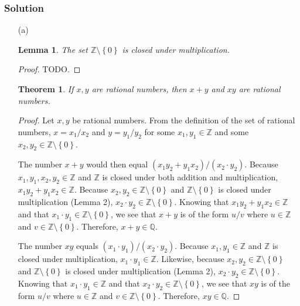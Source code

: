 \documentclass[12pt]{article}
\newtheorem*{thm}{Theorem}
\newtheorem{lem}{Lemma}
\begin{document}
\subsubsection*{Solution}
\begin{itemize}
\item[(a)]
\begin{lem}
The set $\mathbb{Z} \setminus \left\{0\right\}$ is closed under multiplication.
\end{lem}

\begin{proof}
TODO.
\end{proof}

\begin{thm}
If $x, y$ are rational numbers, then $x + y$ and $xy$ are rational numbers.
\end{thm}

\begin{proof}
Let $x, y$ be rational numbers. From the definition of the set of rational numbers, $x = x_1/x_2$ and $y = y_1/y_2$ for some $x_1, y_1 \in \mathbb{Z}$ and some $x_2, y_2 \in \mathbb{Z} \setminus \left\{0\right\}$.

The number $x + y$ would then equal $\left(x_1y_2 + y_1x_2\right)/\left(x_2 \cdot y_2\right)$. Because $x_1, y_1, x_2, y_2 \in \mathbb{Z}$ and $\mathbb{Z}$ is closed under both addition and multiplication, $x_1y_2 + y_1x_2 \in \mathbb{Z}$. 
Because $x_2, y_2 \in \mathbb{Z}\setminus\left\{0\right\}$ and $\mathbb{Z}\setminus\left\{0\right\}$ is closed under multiplication (Lemma 2), $x_2 \cdot y_2 \in \mathbb{Z} \setminus \left\{0\right\}$. Knowing that $x_1y_2 + y_1x_2 \in \mathbb{Z}$ and that $x_1 \cdot y_1 \in \mathbb{Z} \setminus \left\{0\right\}$, we see that $x + y$ is of the form $u / v$ where $u \in \mathbb{Z}$ and $v \in \mathbb{Z} \setminus \left\{0\right\}$. Therefore, $x + y \in \mathbb{Q}$.

The number $xy$ equals $\left(x_1 \cdot y_1\right) / \left(x_2 \cdot y_2\right)$. Because $x_1, y_1 \in \mathbb{Z}$ and $\mathbb{Z}$ is closed under multiplication, $x_1 \cdot y_1 \in \mathbb{Z}$. Likewise, because $x_2, y_2 \in \mathbb{Z} \setminus \left\{0\right\}$ and $\mathbb{Z} \setminus \left\{0\right\}$ is closed under multiplication (Lemma 2), $x_2 \cdot y_2 \in \mathbb{Z} \setminus \left\{0\right\}$. Knowing that $x_1 \cdot y_1 \in \mathbb{Z}$ and that $x_2 \cdot y_2 \in \mathbb{Z} \setminus \left\{0\right\}$, we see that $xy$ is of the form $u / v$ where $u \in \mathbb{Z}$ and $v \in \mathbb{Z} \setminus \left\{0\right\}$. Therefore, $xy \in \mathbb{Q}$.
\end{proof}


\end{itemize}
\end{document}
